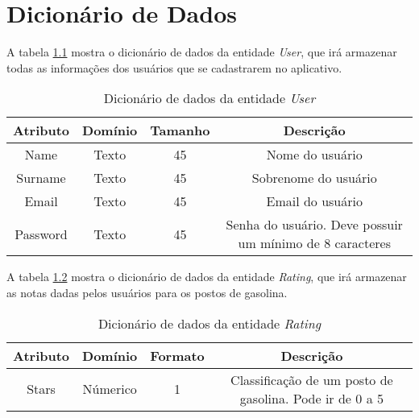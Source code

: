 \chapter{Dicionário de Dados}
\label{chap:dicionario}

A tabela \ref{dic:user} mostra o dicionário de dados da entidade \textit{User}, que irá armazenar todas as informações dos usuários que se cadastrarem no aplicativo.
\begin{table}[H]
\centering
\caption{Dicionário de dados da entidade \textit{User}}
\label{dic:user}
\begin{tabular}{cccc}
\toprule
\textbf{Atributo} & \textbf{Domínio} & \textbf{Tamanho} & \textbf{Descrição} \\
\midrule
Name                            & Texto                          & 45                             & Nome do usuário \\
Surname                         & Texto                          & 45                             & Sobrenome do usuário\\
Email                           & Texto                          & 45                             & Email do usuário\\
Password                        & Texto                          & 45                             & Senha do usuário. Deve possuir um mínimo de 8 caracteres\\
\bottomrule
\end{tabular}
\end{table}

A tabela \ref{dic:rating} mostra o dicionário de dados da entidade \textit{Rating}, que irá armazenar as notas dadas pelos usuários para os postos de gasolina.
\begin{table}[H]
\centering
\caption{Dicionário de dados da entidade \textit{Rating}}
\label{dic:rating}
\begin{tabular}{cccc}
\toprule
\textbf{Atributo} & \textbf{Domínio} & \textbf{Formato} & \textbf{Descrição} \\
\midrule
Stars                           & Númerico                       & 1                              & Classificação de um posto de gasolina. Pode ir de 0 a 5\\
\bottomrule
\end{tabular}
\end{table}

